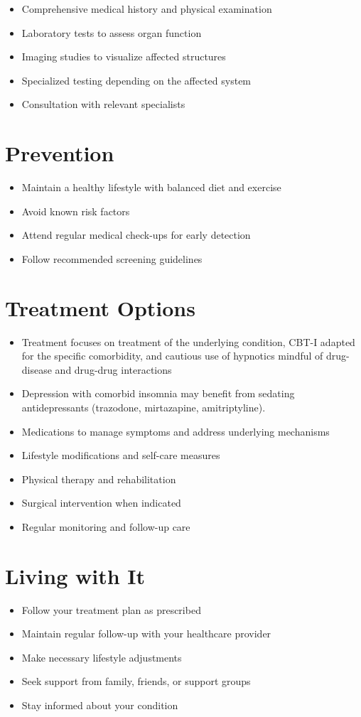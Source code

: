 \begin{itemize}[noitemsep]
  \item Comprehensive medical history and physical examination
  \item Laboratory tests to assess organ function
  \item Imaging studies to visualize affected structures
  \item Specialized testing depending on the affected system
  \item Consultation with relevant specialists
\end{itemize}
\section{Prevention}
\begin{itemize}[noitemsep]
  \item Maintain a healthy lifestyle with balanced diet and exercise
  \item Avoid known risk factors
  \item Attend regular medical check-ups for early detection
  \item Follow recommended screening guidelines
\end{itemize}
\section{Treatment Options}
\begin{itemize}[noitemsep]
  \item Treatment focuses on treatment of the underlying condition, CBT-I adapted for the specific comorbidity, and cautious use of hypnotics mindful of drug-disease and drug-drug interactions
  \item Depression with comorbid insomnia may benefit from sedating antidepressants (trazodone, mirtazapine, amitriptyline).
  \item Medications to manage symptoms and address underlying mechanisms
  \item Lifestyle modifications and self-care measures
  \item Physical therapy and rehabilitation
  \item Surgical intervention when indicated
  \item Regular monitoring and follow-up care
\end{itemize}
\section{Living with It}
\begin{itemize}[noitemsep]
  \item Follow your treatment plan as prescribed
  \item Maintain regular follow-up with your healthcare provider
  \item Make necessary lifestyle adjustments
  \item Seek support from family, friends, or support groups
  \item Stay informed about your condition
\end{itemize}
